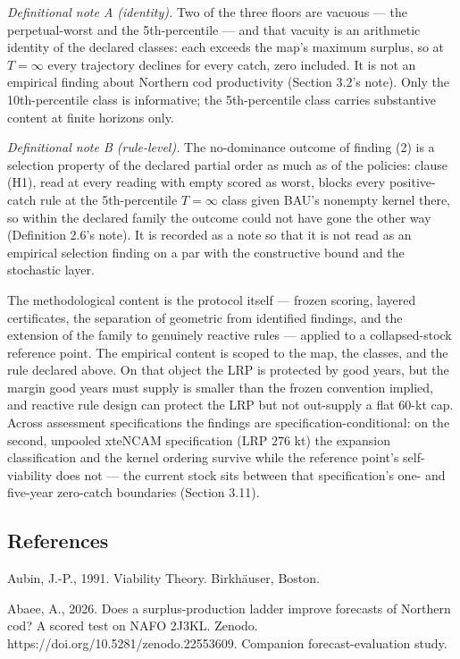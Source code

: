 \documentclass[11pt]{article}
\begin{document}
\emph{Definitional note A (identity).} Two of the three floors are
vacuous --- the perpetual-worst and the 5th-percentile --- and that
vacuity is an arithmetic identity of the declared classes: each exceeds
the map's maximum surplus, so at \(T = \infty\) every trajectory
declines for every catch, zero included. It is not an empirical finding
about Northern cod productivity (Section 3.2's note). Only the
10th-percentile class is informative; the 5th-percentile class carries
substantive content at finite horizons only.

\emph{Definitional note B (rule-level).} The no-dominance outcome of
finding (2) is a selection property of the declared partial order as
much as of the policies: clause (H1), read at every reading with empty
scored as worst, blocks every positive-catch rule at the 5th-percentile
\(T=\infty\) class given BAU's nonempty kernel there, so within the
declared family the outcome could not have gone the other way
(Definition 2.6's note). It is recorded as a note so that it is not read
as an empirical selection finding on a par with the constructive bound
and the stochastic layer.

The methodological content is the protocol itself --- frozen scoring,
layered certificates, the separation of geometric from identified
findings, and the extension of the family to genuinely reactive rules
--- applied to a collapsed-stock reference point. The empirical content
is scoped to the map, the classes, and the rule declared above. On that
object the LRP is protected by good years, but the margin good years
must supply is smaller than the frozen convention implied, and reactive
rule design can protect the LRP but not out-supply a flat 60-kt cap.
Across assessment specifications the findings are
specification-conditional: on the second, unpooled xteNCAM specification
(LRP \(276\) kt) the expansion classification and the kernel ordering
survive while the reference point's self-viability does not --- the
current stock sits between that specification's one- and five-year
zero-catch boundaries (Section 3.11).

\subsection{References}\label{references}

Aubin, J.-P., 1991. Viability Theory. Birkh\"auser, Boston.

Abaee, A., 2026. Does a surplus-production ladder improve forecasts of
Northern cod? A scored test on NAFO 2J3KL. Zenodo.
https://doi.org/10.5281/zenodo.22553609. Companion forecast-evaluation
study.
\end{document}
